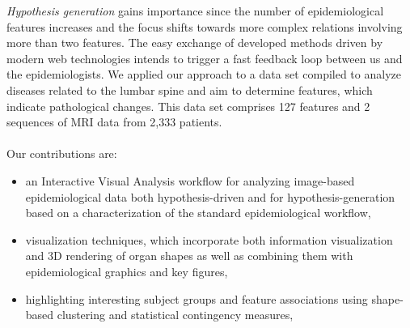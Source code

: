 \documentclass[journal]{style/vgtc} 			          %
\begin{document}
%
\emph{Hypothesis generation} gains importance since the number of epidemiological features increases and the focus shifts towards more complex relations involving more than two features.
%
The easy exchange of developed methods driven by modern web technologies intends to trigger a fast feedback loop between us and the epidemiologists.
We applied our approach to a data set compiled to analyze diseases related to the lumbar spine and aim to determine features, which indicate pathological changes.
%
This data set comprises 127 features and 2 sequences of MRI data from 2,333 patients.
\\\\
Our contributions are:
\begin{itemize}
	\item an Interactive Visual Analysis workflow for analyzing image-based epidemiological data both hypothesis-driven and for hypothesis-generation based on a characterization of the standard epidemiological workflow,
	\item visualization techniques, which incorporate both information visualization and 3D rendering of organ shapes as well as combining them with epidemiological graphics and key figures,
	\item highlighting interesting subject groups and feature associations using shape-based clustering and statistical contingency measures,

\end{itemize}
\end{document}
